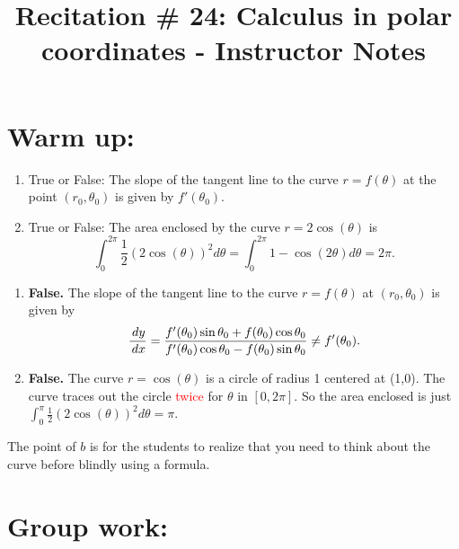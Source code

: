 \documentclass[handout,instructornotes]{ximera}
\title{Recitation \# 24: Calculus in polar coordinates - Instructor Notes}
\begin{document}
\begin{abstract}		\end{abstract}
\maketitle



\section{Warm up:}
\begin{enumerate}
\item True or False:  The slope of the tangent line to the curve $r = f(\theta)$ at the point $(r_0, \theta_0)$ is given by $f'(\theta_0)$.  

\item True or False: The area enclosed by the curve $r=2\cos(\theta)$ is 
$$\int_{0}^{2\pi} \frac{1}{2} (2 \cos (\theta))^2 d \theta = \int_0^{2\pi} 1-\cos(2\theta) d\theta = 2\pi.$$
\end{enumerate}

	\begin{freeResponse}
\begin{enumerate}
\item	{\bf False.}  The slope of the tangent line to the curve $r = f(\theta)$ at $(r_0, \theta_0)$ is given by
		\[
		\frac{\,d y}{\,d x} = \frac{f'(\theta_0) \sin \theta_0 + f(\theta_0) \cos \theta_0}{f'(\theta_0) \cos \theta_0 - f(\theta_0) \sin \theta_0 } \neq f'(\theta_0).
		\]

\item {\bf False.} The curve $r=\cos(\theta)$ is a circle of radius 1 centered at (1,0). The curve traces out the circle \textcolor{red}{twice} for $\theta$ in $[0, 2\pi]$. So the area enclosed is just $\int_0^{\pi} \frac{1}{2} (2 \cos(\theta))^2 d\theta = \pi$.
\end{enumerate}
	\end{freeResponse}
	
\begin{instructorNotes}
The point of $b$ is for the students to realize that you need to think about the curve before blindly using a formula.
\end{instructorNotes}







\section{Group work:}
\end{document}
